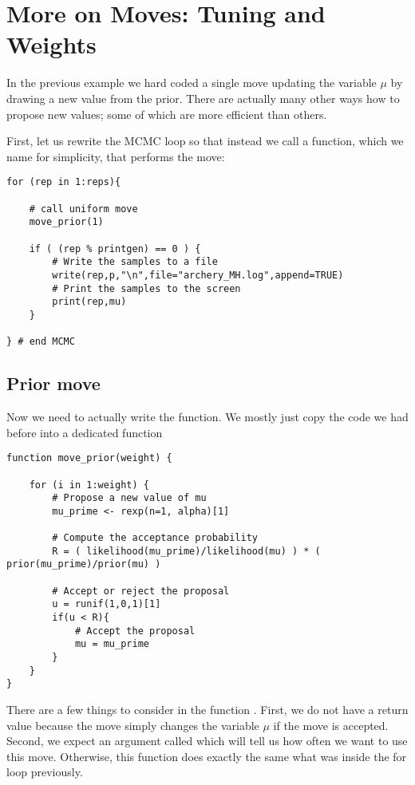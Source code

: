 \section{More on Moves: Tuning and Weights}\label{sect:More_on_Moves}

In the previous example we hard coded a single move updating the variable $\mu$ by drawing a new value from the prior.
There are actually many other ways how to propose new values; some of which are more efficient than others.

First, let us rewrite the MCMC loop so that instead we call a function, which we name  for simplicity, that performs the move:
{\tt \begin{snugshade*}
\begin{lstlisting}    
for (rep in 1:reps){
    
    # call uniform move
    move_prior(1)
    
    if ( (rep % printgen) == 0 ) {
        # Write the samples to a file
        write(rep,p,"\n",file="archery_MH.log",append=TRUE)
        # Print the samples to the screen
        print(rep,mu)
    }

} # end MCMC
\end{lstlisting}
\end{snugshade*}}

\subsection{Prior move}
Now we need to actually write the  function.
We mostly just copy the code we had before into a dedicated function
{\tt \begin{snugshade*}
\begin{lstlisting}    
function move_prior(weight) {

    for (i in 1:weight) {
        # Propose a new value of mu
        mu_prime <- rexp(n=1, alpha)[1]

        # Compute the acceptance probability
        R = ( likelihood(mu_prime)/likelihood(mu) ) * ( prior(mu_prime)/prior(mu) ) 

        # Accept or reject the proposal
        u = runif(1,0,1)[1] 
        if(u < R){
            # Accept the proposal
            mu = mu_prime 
        }
    }
}
\end{lstlisting}
\end{snugshade*}}
There are a few things to consider in the function .
First, we do not have a return value because the move simply changes the variable $\mu$ if the move is accepted.
Second, we expect an argument called  which will tell us how often we want to use this move.
Otherwise, this function does exactly the same what was inside the for loop previously.

